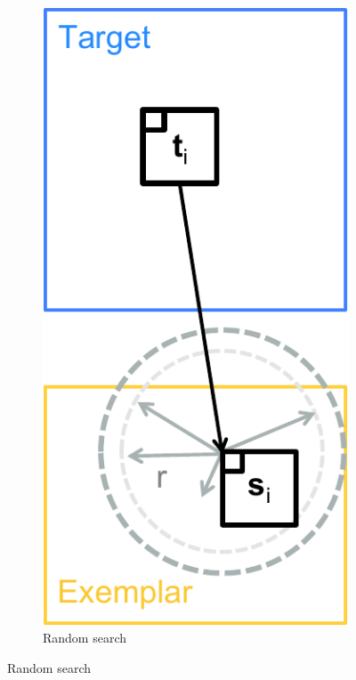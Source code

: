 \begin{figure}[h]
\begin{subfigure}[t]{0.155\textwidth}
	\end{subfigure}
	\begin{subfigure}[t]{0.155\textwidth}
		\includegraphics[width=\textwidth]{figures/randsearch_text}
		\caption{Random search}
	\end{subfigure}

\end{figure}
